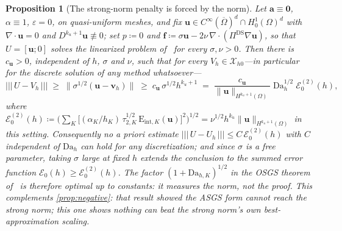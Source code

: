 \documentclass[11pt]{article}
\newtheorem{proposition}[theorem]{Proposition}
\theoremstyle{remark}
\newcommand{\bu}{\boldsymbol{u}}
\newcommand{\bv}{\boldsymbol{v}}
\newcommand{\ba}{\boldsymbol{a}}
\newcommand{\bff}{\boldsymbol{f}}
\newcommand{\ViscProj}{\Pi^{\mathrm{DS}}}
\newcommand{\norm}[1]{\lVert #1 \rVert}
\newcommand{\tnorm}[1]{\lvert\!\lvert\!\lvert\, #1 \,\rvert\!\rvert\!\rvert}
\newcommand{\Eint}[2]{\mathrm{E}_{\mathrm{int},#1}(#2)}
\newcommand{\Dah}{\mathrm{Da}_{h,K}}
\newcommand{\Xhz}{\mathcal{X}_{h0}}
\newcommand{\EF}{\mathcal{E}}
\begin{document}
\begin{proposition}[The strong-norm penalty is forced by the norm]
\label{prop:floor}
Let $\ba \equiv \boldsymbol 0$, $\alpha \equiv 1$, $\varepsilon = 0$, on
quasi-uniform meshes, and fix
$\bu \in C^\infty(\overline\Omega)^d \cap H^1_0(\Omega)^d$ with
$\nabla\cdot\bu = 0$ and $D^{k_u+1}\bu \not\equiv 0$; set $p \coloneqq 0$ and
$\bff \coloneqq \sigma\bu - 2\nu\,\nabla\cdot(\ViscProj\nabla\bu)$, so that
$U = [\bu; 0]$ solves the linearized problem of~\cite{OSGSnote} for every
$\sigma, \nu > 0$. Then there is $c_{\bu} > 0$, independent of $h$, $\sigma$ and
$\nu$, such that for \emph{every} $V_h \in \Xhz$---in particular for the discrete
solution of any method whatsoever---
\[
  \tnorm{U - V_h} \;\ge\; \norm{\sigma^{1/2}(\bu - \bv_h)}
  \;\ge\; c_{\bu}\,\sigma^{1/2} h^{k_u+1}
  \;=\; \frac{c_{\bu}}{\norm{\bu}_{H^{k_u+1}(\Omega)}}\;
  \mathrm{Da}_h^{1/2}\;\EF_0^{(2)}(h),
\]
where $\EF_0^{(2)}(h) \coloneqq \bigl( \sum_K \bigl[(\alpha_K/h_K)\,
\tau_{2,K}^{1/2}\,\Eint{K}{\bu}\bigr]^2 \bigr)^{1/2} = \nu^{1/2} h^{k_u}
\norm{\bu}_{H^{k_u+1}(\Omega)}$ in this setting. Consequently no a priori estimate
$\tnorm{U - U_h} \le C\,\EF_0^{(2)}(h)$ with $C$ independent of $\mathrm{Da}_h$ can
hold for any discretization; and since $\sigma$ is a free parameter, taking $\sigma$
large at fixed $h$ extends the conclusion to the summed error function $\EF_0(h)
\ge \EF_0^{(2)}(h)$. The factor $(1+\Dah)^{1/2}$ in the OSGS theorem
of~\cite{OSGSnote} is therefore optimal up to constants: it measures the norm, not
the proof. This complements \cref{prop:negative}: that result showed the ASGS form
cannot \emph{reach} the strong norm; this one shows nothing can \emph{beat} the
strong norm's own best-approximation scaling.
\end{proposition}
\end{document}
